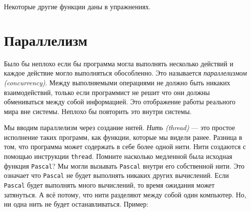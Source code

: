 
Некоторые другие функции даны в упражнениях.

\section{Параллелизм}

Было бы неплохо если бы программа могла выполнять несколько действий и каждое действие могло выполняться обособленно. Это называется \emph{параллелизмом (concurrency)}. Между выполняемыми операциями не должно быть никаких взаимодействий, только если программист не решит что они должны обмениваться между собой информацией. Это отображение работы реального мира вне системы. Неплохо бы повторить это внутри системы.

Мы вводим параллелизм через создание нитей. \emph{Нить (thread)} --- это простое исполнение таких программ, как функции, которые мы видели ранее. Разница в том, что программа может содержать в себе более одной нити. Нити создаются с помощью инструкции \lstinline|thread|. Помните насколько медленной была исходная функция \lstinline|Pascal|? Мы могли вызывать \lstinline|Pascal| внутри его собственной нити. Это означает что \lstinline|Pascal| не будет выполнять никаких других вычислений. Если \lstinline|Pascal| будет выполнять много вычислений, то время ожидания может затянуться. А всё потому, что нити разделяют между собой один компьютер. Но, ни одна нить не будет останавливаться. Пример:

